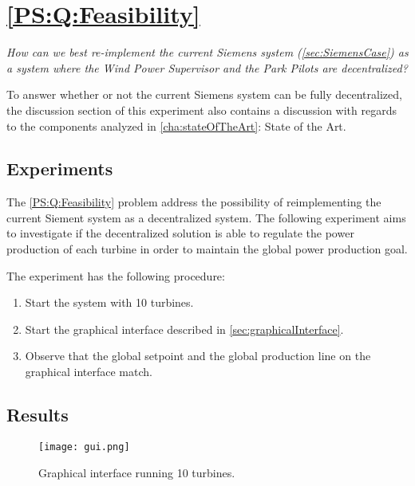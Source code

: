 
\section{\ref{PS:Q:Feasibility}}

\textit{How can we best re-implement the current Siemens system (\cref{sec:SiemensCase}) as a system where the Wind Power Supervisor and the Park Pilots are decentralized?}\newline\newline

\noindent To answer whether or not the current Siemens system can be fully decentralized, the discussion section of this experiment also contains a discussion with regards to the components analyzed in \cref{cha:stateOfTheArt}: State of the Art.

\subsection{Experiments}

The \ref{PS:Q:Feasibility} problem address the possibility of reimplementing the current Siement system as a decentralized system. The following experiment aims to investigate if the decentralized solution is able to regulate the power production of each turbine in order to maintain the global power production goal.

The experiment has the following procedure:
\begin{enumerate}
	\item Start the system with 10 turbines.
	\item Start the graphical interface described in \cref{sec:graphicalInterface}.
	\item Observe that the global setpoint and the global production line on the graphical interface match.
\end{enumerate}

\subsection{Results}
\label{sec:exp:feasibility}
\begin{figure} [!h]
	\centering
	\texttt{[image: gui.png]} 
	\caption[Graphical interface running 10 turbines]{
		\label{fig:graphicalInterface} 
		\footnotesize{%
			Graphical interface running 10 turbines.
		}
	}
\end{figure}

